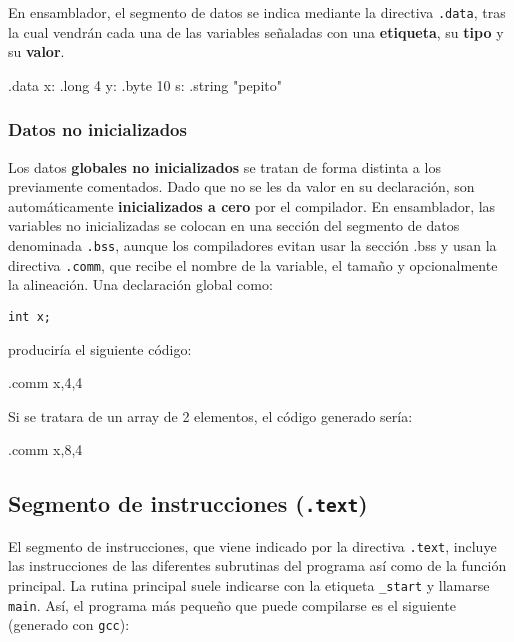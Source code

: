 \documentclass[11pt]{scrartcl}
\begin{document}
En ensamblador, el segmento de datos se indica mediante la directiva
\texttt{.data}, tras la cual vendrán cada una de las variables señaladas con una
\textbf{etiqueta}, su \textbf{tipo} y su \textbf{valor}.

\begin{gascode}
    .data
x:
    .long  4
y:
    .byte 10  
s:
    .string "pepito\n"
\end{gascode}

\subsubsection{Datos no inicializados}

Los datos \textbf{globales no inicializados} se tratan de forma distinta a los
previamente comentados. Dado que no se les da valor en su declaración, son
automáticamente \textbf{inicializados a cero} por el compilador. En ensamblador,
las variables no inicializadas se colocan en una sección del segmento de datos
denominada \texttt{.bss}, aunque los compiladores evitan usar la sección .bss y
usan la directiva \texttt{.comm}, que recibe el nombre de la variable, el tamaño
y opcionalmente la alineación. Una declaración global como:

\begin{verbatim}
int x;  
\end{verbatim}

produciría el siguiente código:

\begin{gascode}
    .comm   x,4,4  
\end{gascode}

Si se tratara de un array de 2 elementos, el código generado sería:

\begin{gascode}
    .comm   x,8,4  
\end{gascode}

\subsection{Segmento de instrucciones (\texttt{.text})}

El segmento de instrucciones, que viene indicado por la directiva
\texttt{.text}, incluye las instrucciones de las diferentes subrutinas del
programa así como de la función principal. La rutina principal suele indicarse
con la etiqueta \texttt{\_start} y llamarse \texttt{main}. Así, el programa más
pequeño que puede compilarse es el siguiente (generado con \texttt{gcc}):
\end{document}
